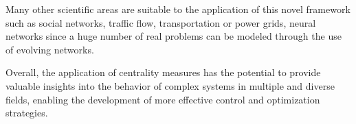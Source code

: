 Many other scientific areas are suitable to the application of this novel framework such as social networks, traffic flow, transportation or power grids, neural networks  since a huge number of real problems can be modeled through the use of evolving networks.

Overall, the application of centrality measures has the potential to provide valuable insights into the behavior of complex systems in multiple and diverse fields, enabling the development of more effective control and optimization strategies.

